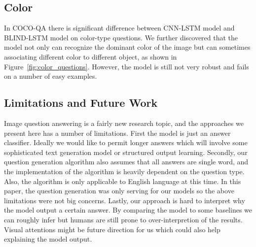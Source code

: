 \documentclass{article}
\renewcommand{\#}[1]{\textbf{#1}}
\begin{document}
\subsection{Color}
In COCO-QA there is significant difference between CNN-LSTM model and BLIND-LSTM model on color-type questions. We further discovered that the model not only can recognize the dominant color of the image but can sometimes associating different color to different object, as shown in Figure~\ref{fig:color_questions}. However, the model is still not very robust and fails on a number of easy examples.

\subsection{Limitations and Future Work}
Image question answering is a fairly new research topic, and the approaches we present here has a number of limitations. First the model is just an answer classifier. Ideally we would like to permit longer answers which will involve some sophisticated text generation model or structured output learning. Secondly, our question generation algorithm also assumes that all answers are single word, and the implementation of the algorithm is heavily dependent on the question type. Also, the algorithm is only applicable to English language at this time. In this paper, the question generation was only serving for our models so the above limitations were not big concerns. Lastly, our approach is hard to interpret why the model output a certain answer. By comparing the model to some baselines we can roughly infer but humans are still prone to over-interpretion of the results. Visual attentions might be future direction for us which could also help explaining the model output.
\end{document}
